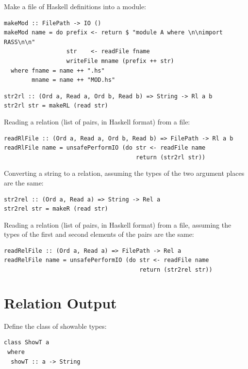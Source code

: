 \documentclass[11pt]{article}
\newlength{\fminilength}
\newenvironment{fminipage}[1][\linewidth]
 {\setlength{\fminilength}{#1-2\fboxsep-2\fboxrule-1em}%
  \bigskip\begin{lrbox}{\fminibox}\quad\begin{minipage}{\fminilength}\bigskip}
 {\smallskip\end{minipage}\end{lrbox}\noindent\fbox{\usebox{\fminibox}}\bigskip}
\newcommand{\bc}{\begin{fminipage}}
\newcommand{\ec}{\end{fminipage}}
\begin{document}
Make a file of Haskell definitions into a module: 

\bc\begin{verbatim} 
makeMod :: FilePath -> IO ()
makeMod name = do prefix <- return $ "module A where \n\nimport RASS\n\n"
                  str    <- readFile fname
                  writeFile mname (prefix ++ str)
  where fname = name ++ ".hs"
        mname = name ++ "MOD.hs"
\end{verbatim}\ec

\bc\begin{verbatim}
str2rl :: (Ord a, Read a, Ord b, Read b) => String -> Rl a b 
str2rl str = makeRL (read str)
\end{verbatim}\ec

Reading a relation (list of pairs, in Haskell format) from a file: 

\bc\begin{verbatim}
readRlFile :: (Ord a, Read a, Ord b, Read b) => FilePath -> Rl a b
readRlFile name = unsafePerformIO (do str <- readFile name 
                                      return (str2rl str))
\end{verbatim}\ec

Converting a string to a relation, assuming the types of the 
two argument places are the same: 

\bc\begin{verbatim}
str2rel :: (Ord a, Read a) => String -> Rel a
str2rel str = makeR (read str)
\end{verbatim}\ec

Reading a relation (list of pairs, in Haskell format) from a file,
assuming the types of the first and second elements of the pairs are
the same:

\bc\begin{verbatim}
readRelFile :: (Ord a, Read a) => FilePath -> Rel a
readRelFile name = unsafePerformIO (do str <- readFile name
                                       return (str2rel str))
\end{verbatim}\ec

\section{Relation Output} 

Define the class of showable types: 

\bc\begin{verbatim}
class ShowT a
 where
  showT :: a -> String
\end{verbatim}\ec
\end{document}

